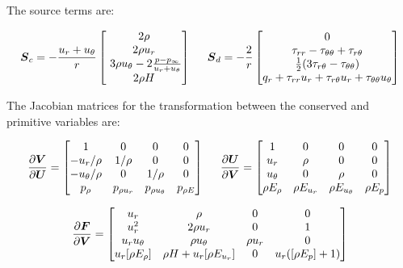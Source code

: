 \documentclass[10pt]{article}
\begin{document}
\begin{flushleft}
The source terms are:

\begin{equation}
    \boldsymbol{S}_c = -\frac{u_r + u_\theta}{r}
        \begin{bmatrix}
        2 \rho \\ 2 \rho u_r \\ \ 3 \rho u_\theta - 2 \frac{p-p_\infty}{u_r + u_\theta} \\ 2 \rho H 
        \end{bmatrix}
    \hspace{5mm}
    \boldsymbol{S}_d = -\frac{2}{r}
        \begin{bmatrix}
        0 \\ \tau_{rr} - \tau_{\theta \theta} + \tau_{r \theta} \\ \frac{1}{2} (3\tau_{r \theta} - \tau_{\theta \theta}) \\ q_r + \tau_{rr} u_r + \tau_{r \theta} u_r + \tau_{\theta \theta} u_\theta 
        \end{bmatrix}
\end{equation}

The Jacobian matrices for the transformation between the conserved and primitive variables are:

\begin{equation*}
    \frac{\partial \boldsymbol{V}}{\partial \boldsymbol{U}} = \begin{bmatrix} 
        1 & 0 & 0 & 0 \\
        -u_r / \rho & 1 / \rho & 0 & 0 \\
        -u_\theta / \rho & 0 & 1 / \rho & 0 \\
        p_\rho & p_{\rho u_r} & p_{\rho u_\theta} & p_{\rho E}
    \end{bmatrix} \hspace{5mm} \frac{\partial \boldsymbol{U}}{\partial \boldsymbol{V}} = \begin{bmatrix}
        1 & 0 & 0 & 0 \\
        u_r  & \rho & 0 & 0 \\
        u_\theta & 0 & \rho & 0 \\
        \rho E_\rho & \rho E_{u_r} & \rho E_{u_\theta} & \rho E_p
    \end{bmatrix}
\end{equation*}

\begin{equation*}
    \frac{\partial \boldsymbol{F}}{\partial \boldsymbol{V}} = \begin{bmatrix}
        u_r & \rho & 0 & 0 \\
        u_r^2 & 2 \rho u_r & 0 & 1 \\
        u_r u_\theta & \rho u_\theta & \rho u_r & 0 \\
        u_r [\rho E_{\rho}] & \rho H + u_r [\rho E_{u_r}] & 0 & u_r ([\rho E_p] + 1)
    \end{bmatrix}
\end{equation*}


\end{flushleft}
\end{document}
